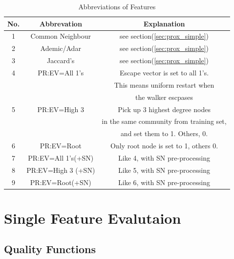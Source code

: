 \documentclass[11pt,a4paper]{article}
\begin{document}
\begin{table}[htb]
\centering
\caption{Abbreviations of Features}
\label{tbl:abbr}
\begin{tabular}{c|c|c}
\hline
No. & Abbrevation & Explanation \\
\hline
1 & Common Neighbour  & see section(\ref{sec:prox_simple}) \\
\hline
2 & Ademic/Adar  &  see section(\ref{sec:prox_simple})\\
\hline
3 & Jaccard’s & see section(\ref{sec:prox_simple}) \\
\hline
4 & PR:EV=All 1’s & Escape vector is set to all 1's.\\
 & & This means uniform restart when \\
 &  & the walker escpases \\
\hline
5 & PR:EV=High 3 & Pick up 3 highest degree nodes \\
 & & in the same community from training set, \\
 & & and set them to 1. Others, 0.  \\
\hline
6 & PR:EV=Root & Only root node is set to 1, others 0. \\
\hline
7 & PR:EV=All 1’s(+SN) & Like 4, with SN pre-processing\\
\hline
8 & PR:EV=High 3 (+SN) & Like 5, with SN pre-processing\\
\hline
9 & PR:EV=Root(+SN) & Like 6, with SN pre-processing\\
\hline
\end{tabular}
\end{table}

\section{Single Feature Evalutaion}

\subsection{Quality Functions}
\end{document}
